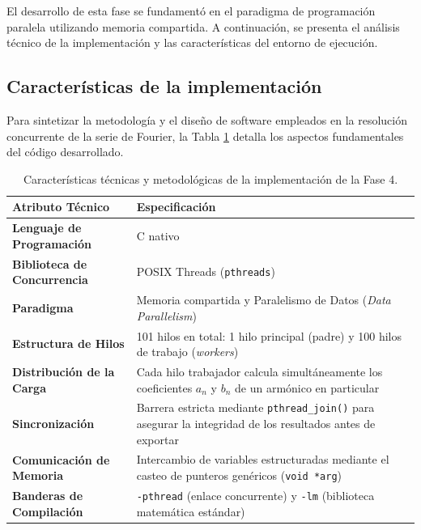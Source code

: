 El desarrollo de esta fase se fundamentó en el paradigma de programación paralela utilizando memoria compartida. A continuación, se presenta el análisis técnico de la implementación y las características del entorno de ejecución.

\subsection*{Características de la implementación}
Para sintetizar la metodología y el diseño de software empleados en la resolución concurrente de la serie de Fourier, la Tabla \ref{tab:caracteristicas_implementacion} detalla los aspectos fundamentales del código desarrollado.

\begin{table}[H]
\centering
\renewcommand{\arraystretch}{1.3}
\begin{tabular}{|l|p{10cm}|}
\hline
\textbf{Atributo Técnico} & \textbf{Especificación} \\ \hline
\textbf{Lenguaje de Programación} & C nativo \\ \hline
\textbf{Biblioteca de Concurrencia} & POSIX Threads (\texttt{pthreads}) \\ \hline
\textbf{Paradigma} & Memoria compartida y Paralelismo de Datos (\textit{Data Parallelism}) \\ \hline
\textbf{Estructura de Hilos} & 101 hilos en total: 1 hilo principal (padre) y 100 hilos de trabajo (\textit{workers}) \\ \hline
\textbf{Distribución de la Carga} & Cada hilo trabajador calcula simultáneamente los coeficientes $a_n$ y $b_n$ de un armónico en particular \\ \hline
\textbf{Sincronización} & Barrera estricta mediante \texttt{pthread\_join()} para asegurar la integridad de los resultados antes de exportar \\ \hline
\textbf{Comunicación de Memoria} & Intercambio de variables estructuradas mediante el casteo de punteros genéricos (\texttt{void *arg}) \\ \hline
\textbf{Banderas de Compilación} & \texttt{-pthread} (enlace concurrente) y \texttt{-lm} (biblioteca matemática estándar) \\ \hline
\end{tabular}
\caption{Características técnicas y metodológicas de la implementación de la Fase 4.}
\label{tab:caracteristicas_implementacion}
\end{table}

